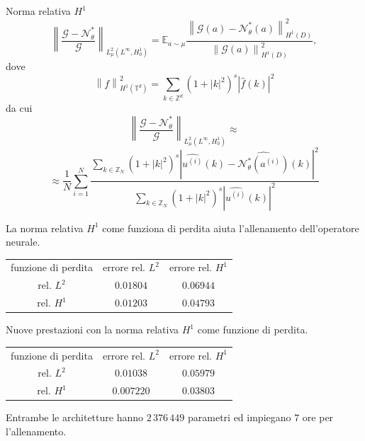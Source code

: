 \documentclass{beamer}
\newcommand{\numberset}{\mathbb}
\newcommand{\Z}{\numberset{Z}}
\begin{document}
\begin{frame}{Norma relativa $ H^1 $}
	\[ \left\| \frac{\mathcal{G} - \mathcal{N}^{*}_{\theta}}{\mathcal{G}}\right\|_{L_{\mu}^2(L^{\infty}, H^{1}_0)} = \mathbb{E}_{a \sim \mu} \frac{\left\| \mathcal{G}(a) - \mathcal{N}^{*}_{\theta}(a) \right\|^{2}_{H^1(D)}}{\left\| \mathcal{G}(a)\right\|^{2}_{H^1(D)}},  \]
	dove \[ \left\| f \right\|_{H^1(\mathbb{T}^d)}^2 = \sum_{k \in \Z^d}	\left(1+|k|^2	\right)^s \left| \widehat{f}(k) \right|^2 \]
	da cui
	\[\left\| \frac{\mathcal{G} - \mathcal{N}^{*}_{\theta}}{\mathcal{G}}\right\|_{L^2_{\mu}(L^{\infty}, H^{1}_0)} \approx\]\[ \approx \frac1N \sum_{i=1}^{N} \frac{\sum_{k \in \Z_{N}}	\left(1+|k|^2 \right)^s \left| \widehat{u^{(i)}}(k) - \widehat{\mathcal{N}_{\theta}^{*}\left(a^{(i)}\right)}(k)\right|^2} {\sum_{k \in \Z_{N}}\left(1+|k|^2	\right)^s \left| \widehat{u^{(i)}}(k) \right|^2}	 \]
\end{frame}

\begin{frame}{}
	\small La norma relativa $ H^1 $ come funziona di perdita aiuta l'allenamento dell'operatore neurale.
	\begin{table}[h!] %
		\centering
		\begin{tabular}{ccc}\toprule
			funzione di perdita & errore rel. $ L^2 $ & errore rel.  $ H^1 $ \\
			\cmidrule{1-3}
			rel. $ L^2 $ & $ 0.01804 $ & $ 0.06944 $\\
			rel. $ H^1 $ & $ 0.01203 $& $ 0.04793 $  \\
			\bottomrule
		\end{tabular}
	\end{table}
	{\small Nuove prestazioni con la norma relativa $ H^1 $ come funzione di perdita.}
	\begin{table}[h!] %
		\centering
		\begin{tabular}{ccc}\toprule
			funzione di perdita &  errore rel. $ L^2 $ & errore rel.  $ H^1 $ \\
			\cmidrule{1-3}
			rel. $ L^2 $ & $ 0.01038 $ & $ 0.05979  $ \\
			rel. $ H^1 $ & $ \mathbf{0.007220} $ & $ \mathbf{0.03803}  $ \\
			\bottomrule
		\end{tabular}
	\end{table}
	{\small Entrambe le architetture hanno $ 2\, 376\, 449 $ parametri ed impiegano $ 7 $ ore per l'allenamento.}
\end{frame}
\end{document}
